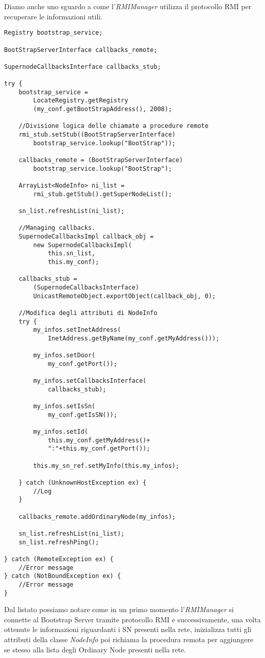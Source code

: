 Diamo anche uno sguardo a come l'\emph{RMIManager} utilizza il protocollo RMI per recuperare le informazioni utili.
\begin{lstlisting}
Registry bootstrap_service;

BootStrapServerInterface callbacks_remote;

SupernodeCallbacksInterface callbacks_stub;

try {
	bootstrap_service = 
		LocateRegistry.getRegistry
		(my_conf.getBootStrapAddress(), 2008);

	//Divisione logica delle chiamate a procedure remote
	rmi_stub.setStub((BootStrapServerInterface) 
		bootstrap_service.lookup("BootStrap"));
		
	callbacks_remote = (BootStrapServerInterface) 
		bootstrap_service.lookup("BootStrap");

	ArrayList<NodeInfo> ni_list = 
		rmi_stub.getStub().getSuperNodeList();

	sn_list.refreshList(ni_list);

	//Managing callbacks.
	SupernodeCallbacksImpl callback_obj = 
		new SupernodeCallbacksImpl(
			this.sn_list, 
			this.my_conf);
			
	callbacks_stub = 
		(SupernodeCallbacksInterface) 
		UnicastRemoteObject.exportObject(callback_obj, 0);

	//Modifica degli attributi di NodeInfo
	try {
		my_infos.setInetAddress(
			InetAddress.getByName(my_conf.getMyAddress()));
			
		my_infos.setDoor(
			my_conf.getPort());
			
		my_infos.setCallbacksInterface(
			callbacks_stub);
			
		my_infos.setIsSn(
			my_conf.getIsSN());
			
		my_infos.setId(
			this.my_conf.getMyAddress()+
			":"+this.my_conf.getPort());
			
		this.my_sn_ref.setMyInfo(this.my_infos);
		
	} catch (UnknownHostException ex) {
		//Log
	}

	callbacks_remote.addOrdinaryNode(my_infos);

	sn_list.refreshList(ni_list);
	sn_list.refreshPing();

} catch (RemoteException ex) {
	//Error message
} catch (NotBoundException ex) {
	//Error message
}
\end{lstlisting}
Dal listato possiamo notare come in un primo momento l'\emph{RMIManager} si connette al Bootstrap Server tramite protocollo RMI e successivamente, una volta ottenute le informazioni riguardanti i SN presenti nella rete, inizializza tutti gli attributi della classe \emph{NodeInfo} poi richiama la procedura remota per aggiungere se stesso alla lista degli Ordinary Node presenti nella rete.

